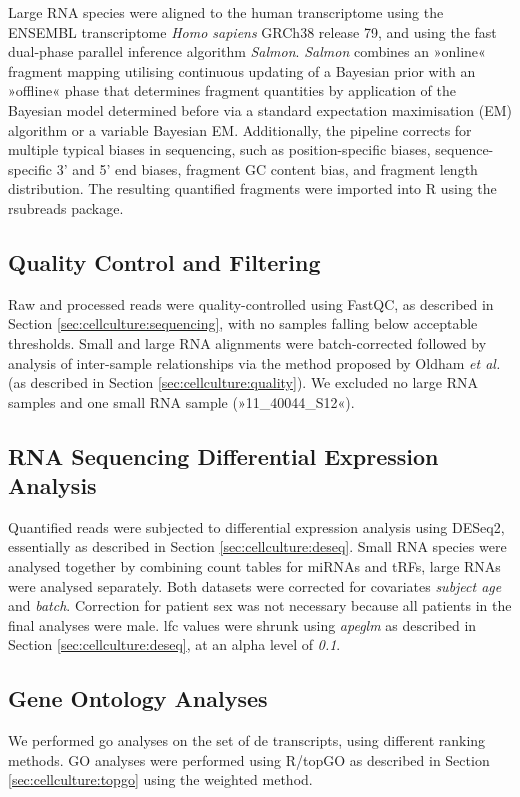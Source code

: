 \begin{method}
Large RNA species were aligned to the human transcriptome using the ENSEMBL transcriptome \emph{Homo sapiens} GRCh38 release 79, and using the fast dual-phase parallel inference algorithm \emph{Salmon}.\cite{Patro2017} \emph{Salmon} combines an »online« fragment mapping utilising continuous updating of a Bayesian prior with an »offline« phase that determines fragment quantities by application of the Bayesian model determined before via a standard expectation maximisation (EM) algorithm or a variable Bayesian EM. Additionally, the pipeline corrects for multiple typical biases in sequencing, such as position-specific biases, sequence-specific 3' and 5' end biases, fragment GC content bias, and fragment length distribution. The resulting quantified fragments were imported into R using the rsubreads package.\cite{Liao2019}

\subsection{Quality Control and Filtering}
Raw and processed reads were quality-controlled using FastQC, as described in Section \ref{sec:cellculture:sequencing}, with no samples falling below acceptable thresholds. Small and large RNA alignments were batch-corrected followed by analysis of inter-sample relationships via the method proposed by Oldham \emph{et al.}\cite{Oldham2012} (as described in Section \ref{sec:cellculture:quality}). We excluded no large RNA samples and one small RNA sample (»11\_40044\_S12«).

\subsection{RNA Sequencing Differential Expression Analysis}
Quantified reads were subjected to differential expression analysis using DESeq2, essentially as described in Section \ref{sec:cellculture:deseq}. Small RNA species were analysed together by combining count tables for miRNAs and tRFs, large RNAs were analysed separately. Both datasets were corrected for covariates \emph{subject age} and \emph{batch}. Correction for patient sex was not necessary because all patients in the final analyses were male. \ac{lfc} values were shrunk using \emph{apeglm} as described in Section \ref{sec:cellculture:deseq}, at an alpha level of \emph{0.1}.

\subsection{Gene Ontology Analyses}
We performed \ac{go} analyses on the set of \ac{de} transcripts, using different ranking methods. GO analyses were performed using R/topGO as described in Section \ref{sec:cellculture:topgo} using the weighted method.


\end{method}
